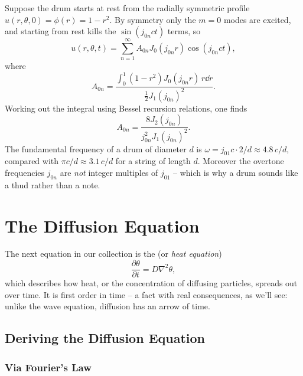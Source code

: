 \begin{example}
    Suppose the drum starts at rest from the radially symmetric profile $u(r, \theta, 0) = \phi(r) = 1 - r^2$.
    By symmetry only the $m = 0$ modes are excited, and starting from rest kills the $\sin(j_{0n}ct)$ terms, so
    $$
    u(r, \theta, t) = \sum_{n = 1}^{\infty} A_{0n} J_0 (j_{0n} r) \cos (j_{0n} c t),
    $$
    where
    $$
    A_{0n} = \frac{\int_0^1 (1 - r^2) J_0(j_{0n} r)\, r \dd r}{\frac{1}{2}J_1(j_{0n})^2}.
    $$
    Working out the integral using Bessel recursion relations, one finds
    $$
    A_{0n} = \frac{8 J_2(j_{0n})}{j_{0n}^2 J_1(j_{0n})^2}.
    $$
    The fundamental frequency of a drum of diameter $d$ is $\omega = j_{01}c \cdot 2/d \approx 4.8\, c/d$, compared with $\pi c/d \approx 3.1\, c/d$ for a string of length $d$. Moreover the overtone frequencies $j_{0n}$ are \emph{not} integer multiples of $j_{01}$ -- which is why a drum sounds like a thud rather than a note.
\end{example}

\section{The Diffusion Equation}

The next equation in our collection is the  (or \emph{heat equation})
$$
\frac{\partial \theta}{\partial t} = D \nabla^2 \theta,
$$
which describes how heat, or the concentration of diffusing particles, spreads out over time. It is first order in time -- a fact with real consequences, as we'll see: unlike the wave equation, diffusion has an arrow of time.

\subsection{Deriving the Diffusion Equation}

\subsubsection*{Via Fourier's Law}

